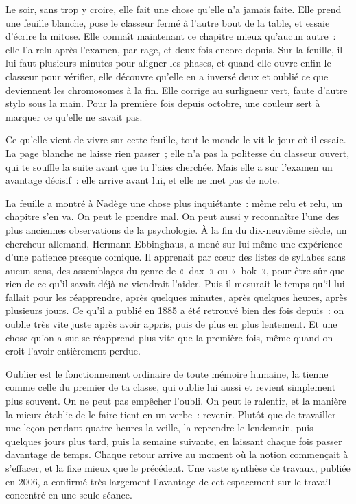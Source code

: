 \documentclass[10.5pt,twoside,openright]{book}
\begin{document}
Le soir, sans trop y croire, elle fait une chose qu’elle n’a jamais faite. Elle prend une feuille blanche, pose le classeur fermé à l’autre bout de la table, et essaie d’écrire la mitose. Elle connaît maintenant ce chapitre mieux qu’aucun autre : elle l’a relu après l’examen, par rage, et deux fois encore depuis. Sur la feuille, il lui faut plusieurs minutes pour aligner les phases, et quand elle ouvre enfin le classeur pour vérifier, elle découvre qu’elle en a inversé deux et oublié ce que deviennent les chromosomes à la fin. Elle corrige au surligneur vert, faute d’autre stylo sous la main. Pour la première fois depuis octobre, une couleur sert à marquer ce qu’elle ne savait pas.

Ce qu’elle vient de vivre sur cette feuille, tout le monde le vit le jour où il essaie. La page blanche ne laisse rien passer ; elle n’a pas la politesse du classeur ouvert, qui te souffle la suite avant que tu l’aies cherchée. Mais elle a sur l’examen un avantage décisif : elle arrive avant lui, et elle ne met pas de note.

La feuille a montré à Nadège une chose plus inquiétante : même relu et relu, un chapitre s’en va. On peut le prendre mal. On peut aussi y reconnaître l’une des plus anciennes observations de la psychologie. À la fin du dix-neuvième siècle, un chercheur allemand, Hermann Ebbinghaus, a mené sur lui-même une expérience d’une patience presque comique. Il apprenait par cœur des listes de syllabes sans aucun sens, des assemblages du genre de « dax » ou « bok », pour être sûr que rien de ce qu’il savait déjà ne viendrait l’aider. Puis il mesurait le temps qu’il lui fallait pour les réapprendre, après quelques minutes, après quelques heures, après plusieurs jours. Ce qu’il a publié en 1885 a été retrouvé bien des fois depuis : on oublie très vite juste après avoir appris, puis de plus en plus lentement. Et une chose qu’on a sue se réapprend plus vite que la première fois, même quand on croit l’avoir entièrement perdue.

Oublier est le fonctionnement ordinaire de toute mémoire humaine, la tienne comme celle du premier de ta classe, qui oublie lui aussi et revient simplement plus souvent. On ne peut pas empêcher l’oubli. On peut le ralentir, et la manière la mieux établie de le faire tient en un verbe : revenir. Plutôt que de travailler une leçon pendant quatre heures la veille, la reprendre le lendemain, puis quelques jours plus tard, puis la semaine suivante, en laissant chaque fois passer davantage de temps. Chaque retour arrive au moment où la notion commençait à s’effacer, et la fixe mieux que le précédent. Une vaste synthèse de travaux, publiée en 2006, a confirmé très largement l’avantage de cet espacement sur le travail concentré en une seule séance.
\end{document}
